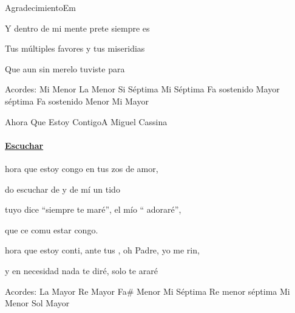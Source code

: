 \documentclass[12pt, spanish]{book}
\newcommand{\NotCCLIed}{\relax}
\begin{document}
\begin{song}{Agradecimiento}{Em}
\begin{SBOpGroup}
            Y dentro de mi mente prete siempre es

            Tus múltiples favores y tus miseridias

            Que aun sin merelo    tuviste para 
        \end{SBOpGroup}

        \ifChordBk
        \begin{SBOpGroup}
            Acordes:\break
            \upchord{\Em}\qquad Mi Menor \hfill
            \upchord{\Am}\qquad La Menor \hfill\null\break
            \upchord{\Bseven}\qquad\qquad\qquad Si S\'eptima \qquad\hfill
            \upchord{\Eseven}\qquad Mi S\'eptima \hfill\null\break
            \upchord{\Fsseven}\qquad Fa sostenido Mayor s\'eptima \hfill
            \upchord{\Fsm}\qquad Fa sostenido Menor \hfill\null\break
            \upchord{\E}\qquad Mi Mayor \hfill\null\break
        \end{SBOpGroup}
        \fi
    \end{song}

    \begin{song}{Ahora Que Estoy Contigo}{A}
    {\SBPubDom} %
    {Miguel Cassina}
    {} %
    {} %
        \ifChordBk
        \paragraph{\mbox{}\hfill\protect\href{https://open.spotify.com/intl-es/track/6LqNz2egKdkGwKDvul2aPn}{Escuchar}\mbox{}\hfill}
        \fi

        \begin{SBVerse}
            hora que estoy congo en tus zos de amor,

            do escuchar de  y de mí un tido

             tuyo dice ``siempre te maré'', el mío `` adoraré'',

            que ce comu estar congo.

            hora que estoy conti, ante tus , oh Padre, yo
            me rin,

            y en  necesidad nada te diré, solo te araré
        \end{SBVerse}

        \ifChordBk
        \begin{SBOpGroup}
            Acordes:
            \upchord{\A}\qquad La Mayor \hfill
            \upchord{\D}\qquad Re Mayor \hfill\null\break
            \upchord{\Fsm}\qquad Fa\# Menor \hfill
            \upchord{\Eseven}\qquad Mi S\'eptima \hfill\null\break
            \upchord{\Dmseven}Re menor s\'eptima \hfill
            \upchord{\Em}\qquad Mi Menor \hfill\null\break
            \upchord{\G}\qquad Sol Mayor \hfill
        \end{SBOpGroup}
        \fi
    \end{song}
\end{document}
